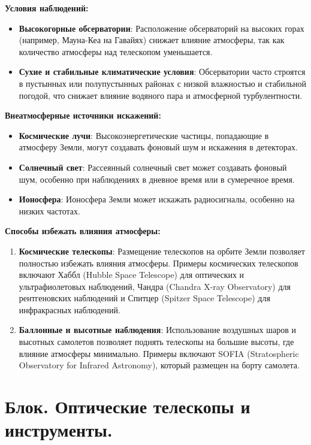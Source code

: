 \documentclass[12pt]{article}
\begin{document}
	\textbf{Условия наблюдений:}
	\begin{itemize}
		\item \textbf{Высокогорные обсерватории}: Расположение обсерваторий на высоких горах (например, Мауна-Кеа на Гавайях) снижает влияние атмосферы, так как количество атмосферы над телескопом уменьшается.
		\item \textbf{Сухие и стабильные климатические условия}: Обсерватории часто строятся в пустынных или полупустынных районах с низкой влажностью и стабильной погодой, что снижает влияние водяного пара и атмосферной турбулентности.
	\end{itemize}
	
	\textbf{Внеатмосферные источники искажений:}
	\begin{itemize}
		\item \textbf{Космические лучи}: Высокоэнергетические частицы, попадающие в атмосферу Земли, могут создавать фоновый шум и искажения в детекторах.
		\item \textbf{Солнечный свет}: Рассеянный солнечный свет может создавать фоновый шум, особенно при наблюдениях в дневное время или в сумеречное время.
		\item \textbf{Ионосфера}: Ионосфера Земли может искажать радиосигналы, особенно на низких частотах.
	\end{itemize}
	
	\textbf{Способы избежать влияния атмосферы:}
	\begin{enumerate}
		\item \textbf{Космические телескопы}: Размещение телескопов на орбите Земли позволяет полностью избежать влияния атмосферы. Примеры космических телескопов включают Хаббл (Hubble Space Telescope) для оптических и ультрафиолетовых наблюдений, Чандра (Chandra X-ray Observatory) для рентгеновских наблюдений и Спитцер (Spitzer Space Telescope) для инфракрасных наблюдений.
		\item \textbf{Баллонные и высотные наблюдения}: Использование воздушных шаров и высотных самолетов позволяет поднять телескопы на большие высоты, где влияние атмосферы минимально. Примеры включают SOFIA (Stratospheric Observatory for Infrared Astronomy), который размещен на борту самолета.
	\end{enumerate}
	\section{Блок. Оптические телескопы и инструменты.}
\end{document}
